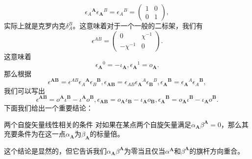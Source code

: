 \begin{equation*}
	\epsilon {_{A}}^{\boldsymbol{A}} \epsilon {_{\boldsymbol{A}}}^{B} =\epsilon {_{A}}^{B} =\begin{pmatrix}
		1 & 0\\
		0 & 1
	\end{pmatrix} ,
\end{equation*}
实际上就是克罗内克$\delta _{A}^{B}$。这意味着对于一个一般的二标架，我们有
\begin{equation*}
	\epsilon ^{AB} =\begin{pmatrix}
		0 & \chi ^{-1}\\
		-\chi ^{-1} & 0
	\end{pmatrix} .
\end{equation*}
这意味着
\begin{equation*}
	\epsilon {_{\boldsymbol{A}}}^{0} =-\iota _{\boldsymbol{A}} ,\epsilon {_{\boldsymbol{A}}}^{1} =o_{\boldsymbol{A}} .
\end{equation*}
那么根据
\begin{equation*}
	\epsilon ^{\boldsymbol{AB}} =\epsilon ^{AB} \epsilon {_{A}}^{\boldsymbol{A}} \epsilon {_{B}}^{\boldsymbol{B}} ,\epsilon _{\boldsymbol{AB}} =\epsilon _{AB} \epsilon {_{\boldsymbol{A}}}^{A} \epsilon {_{\boldsymbol{B}}}^{B} ,\epsilon {_{\boldsymbol{A}}}^{\boldsymbol{B}} =\epsilon {_{\boldsymbol{A}}}^{A} \epsilon {_{A}}^{\boldsymbol{B}} ,
\end{equation*}
我们可以写出
\begin{equation*}
	\epsilon ^{\boldsymbol{AB}} =o^{\boldsymbol{A}} \iota ^{\boldsymbol{B}} -\iota ^{\boldsymbol{A}} o^{\boldsymbol{B}} ,\epsilon _{\boldsymbol{AB}} =o_{\boldsymbol{A}} \iota _{\boldsymbol{B}} -\iota _{\boldsymbol{A}} o_{\boldsymbol{B}} ,\epsilon {_{\boldsymbol{A}}}^{\boldsymbol{B}} =o_{\boldsymbol{A}} \iota ^{\boldsymbol{B}} -\iota _{\boldsymbol{A}} o^{\boldsymbol{B}} .
\end{equation*}
下面我们给出一个重要结论：

\begin{them}[label={them:linear dependence of two spin vector}]{两个自旋矢量线性相关的条件}
	对如果在某点两个自旋矢量满足$\alpha _{\boldsymbol{A}} \beta ^{\boldsymbol{A}} =0$，那么其充要条件为在这一点$\alpha _{\boldsymbol{A}}$为$\beta _{\boldsymbol{A}}$的标量倍。
\end{them}

这个结论是显然的，但它告诉我们$\alpha _{\boldsymbol{A}} \beta ^{\boldsymbol{A}}$为零当且仅当$\alpha ^{\boldsymbol{A}}$和$\beta ^{\boldsymbol{A}}$的旗杆方向重合。



